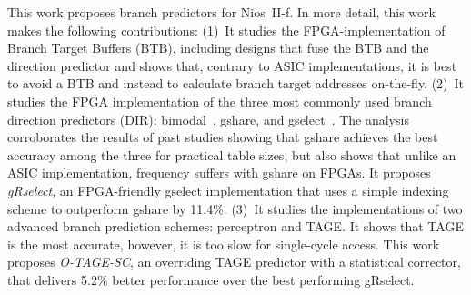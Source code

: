 This work proposes branch predictors for Nios~II-f. In more detail, this work makes the following contributions:
(1)~It studies the FPGA-implementation of Branch Target Buffers (BTB), including designs that fuse the BTB and the direction predictor and shows that, contrary to ASIC implementations, it is best to avoid a BTB and instead to calculate branch target addresses on-the-fly.
(2)~It studies the FPGA implementation of the three most commonly used branch direction predictors (DIR): bimodal~\cite{bimodal}, gshare, and gselect~\cite{McFarling}. The analysis corroborates the results of past studies showing that gshare achieves the best accuracy among the three for practical table sizes, but also shows that unlike an ASIC implementation, frequency suffers with gshare on FPGAs. It proposes \textit{gRselect}, an FPGA-friendly gselect implementation that uses a simple indexing scheme to outperform gshare by 11.4\%.
(3)~It studies the implementations of two advanced branch prediction schemes: perceptron and TAGE. It shows that TAGE is the most accurate, however, it is too slow for single-cycle access. This work proposes \textit{O-TAGE-SC}, an overriding TAGE predictor with a statistical corrector, that delivers 5.2\% better performance over the best performing gRselect.

